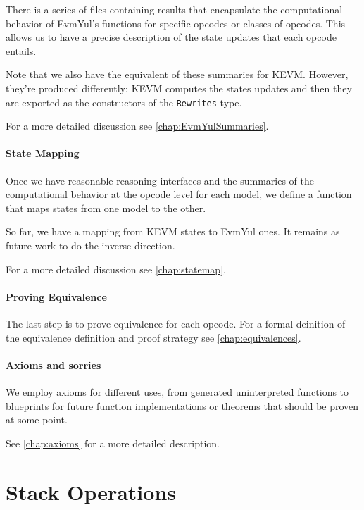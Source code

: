 There is a series of files containing results that encapsulate the computational
behavior of EvmYul's functions for specific opcodes or classes of opcodes. This
allows us to have a precise description of the state updates that each opcode
entails.

Note that we also have the equivalent of these summaries for KEVM. However,
they're produced differently: KEVM computes the states updates and then they are
exported as the constructors of the \texttt{Rewrites} type.

For a more detailed discussion see \ref{chap:EvmYulSummaries}.

\subsubsection*{State Mapping}

Once we have reasonable reasoning interfaces and the summaries of the
computational behavior at the opcode level for each model, we define a function
that maps states from one model to the other.

So far, we have a mapping from KEVM states to EvmYul ones. It remains as future
work to do the inverse direction.

For a more detailed discussion see \ref{chap:statemap}.

\subsubsection*{Proving Equivalence}

The last step is to prove equivalence for each opcode. For a formal deinition of
the equivalence definition and proof strategy see \ref{chap:equivalences}.

\subsubsection*{Axioms and sorries}

We employ axioms for different uses, from generated uninterpreted functions to
blueprints for future function implementations or theorems that should be proven
at some point.

See \ref{chap:axioms} for a more detailed description.



\chapter{Stack Operations}


